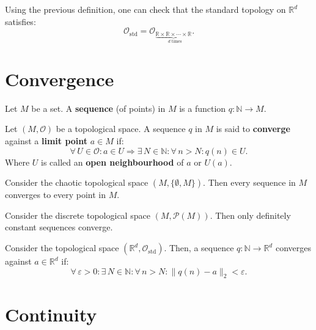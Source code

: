 \documentclass[root.tex]{subfiles}
\begin{document}
\begin{remark}
Using the previous definition, one can check that the standard topology on $\mathbb{R}^d$ satisfies:
$$
\mathcal{O}_\mathrm{std} = \mathcal{O}_{\underbrace{\scriptstyle \mathbb{R} \times\mathbb{R}\times\cdots\times\mathbb{R}}_\text{ $d$ times}}.
$$

\end{remark}


\section{Convergence}

\begin{mydef}
  Let $M$ be a set. A \textbf{sequence} (of points) in $M$ is a function $q : \mathbb{N} \to  M$.
\end{mydef}

\begin{mydef}
Let $(M,\mathcal{O})$ be a topological space. A sequence $q$ in $M$ is said to \textbf{converge} against a \textbf{limit point} $a\in M$ if:
$$
\forall \, U \in \mathcal{O} : a \in U \Rightarrow \exists \, N \in \mathbb{N} : \forall \, n > N : q(n) \in U.
$$
Where $U$ is called an \textbf{open neighbourhood} of $a$ or $U(a)$. 
\end{mydef}

\begin{myex}
  Consider the chaotic topological space $(M,\{\emptyset,M\})$. Then every sequence in $M$ converges to every point in $M$. 
\end{myex}

\begin{myex}
  Consider the discrete topological space $(M,\mathcal{P}(M))$. Then only definitely constant sequences converge. 
\end{myex}

\begin{theorem}
Consider the topological space $(\mathbb{R}^d,\mathcal{O}_\mathrm{std})$. Then, a sequence $q: \mathbb{N} \to \mathbb{R}^d$ converges against $a\in \mathbb{R}^d$ if:
$$
\forall\, \varepsilon >0 : \exists \, N \in \mathbb{N} : \forall \, n > N : \|q(n)-a\|_2<\varepsilon.
$$
\end{theorem}

\section{Continuity}
\end{document}

